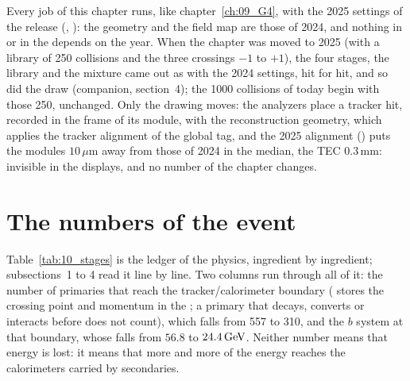 Every job of this chapter runs, like chapter~\ref{ch:09_G4}, with the 2025 settings of the release
(, ): the geometry and the field map are those of 2024,
and nothing in  or in the  depends on the year. When the chapter was moved to
2025 (with a library of 250 collisions and the three crossings $-1$ to $+1$), the four stages, the library and the
mixture came out as with the 2024 settings, hit for hit, and so did the draw (companion, section~4); the 1000
collisions of today begin with those 250, unchanged. Only the drawing moves: the analyzers place a tracker hit, recorded in the frame
of its module, with the reconstruction geometry, which applies the tracker alignment of the global tag, and the
2025 alignment () puts the modules $10\,\mu$m away from those of
2024 in the median, the TEC $0.3$\,mm: invisible in the displays, and no number of the chapter changes.

\section{The numbers of the event}
\label{sec:10_numbers}

Table~\ref{tab:10_stages} is the ledger of the physics, ingredient by ingredient; subsections~1 to 4 read it line by
line. Two columns run through all of it: the number of primaries that reach the tracker/calorimeter boundary
( stores the crossing point and momentum in the ; a primary that decays,
converts or interacts before does not count), which falls from 557 to 310, and the $b$ system at that boundary, whose
\pt{} falls from $56.8$ to $24.4\,\mathrm{GeV}$. Neither number means that energy is lost: it means that more and more of the
energy reaches the calorimeters carried by secondaries.

